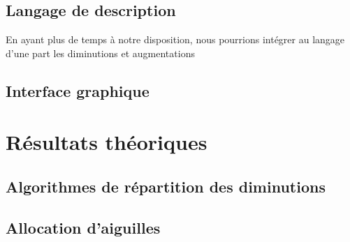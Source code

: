 \documentclass{article}
\begin{document}
\subsection{Langage de description}
En ayant plus de temps à notre disposition, nous pourrions intégrer au langage d'une part les diminutions et augmentations

\subsection{Interface graphique}




\section{Résultats théoriques}

\subsection{Algorithmes de répartition des diminutions}

\subsection{Allocation d'aiguilles}
\end{document}

